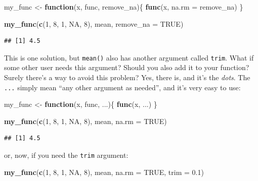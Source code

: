 \documentclass[]{gitbook}
\newenvironment{Shaded}{\begin{snugshade}}{\end{snugshade}}
\newcommand{\ControlFlowTok}[1]{\textcolor[rgb]{0.13,0.29,0.53}{\textbf{#1}}}
\newcommand{\DataTypeTok}[1]{\textcolor[rgb]{0.13,0.29,0.53}{#1}}
\newcommand{\DecValTok}[1]{\textcolor[rgb]{0.00,0.00,0.81}{#1}}
\newcommand{\FloatTok}[1]{\textcolor[rgb]{0.00,0.00,0.81}{#1}}
\newcommand{\KeywordTok}[1]{\textcolor[rgb]{0.13,0.29,0.53}{\textbf{#1}}}
\newcommand{\NormalTok}[1]{#1}
\newcommand{\OtherTok}[1]{\textcolor[rgb]{0.56,0.35,0.01}{#1}}
\newcommand{\StringTok}[1]{\textcolor[rgb]{0.31,0.60,0.02}{#1}}
\theoremstyle{definition}
\theoremstyle{definition}
\theoremstyle{definition}
\theoremstyle{remark}
\begin{document}
\begin{Shaded}
\begin{Highlighting}[]
\NormalTok{my_func <-}\StringTok{ }\ControlFlowTok{function}\NormalTok{(x, func, remove_na)\{}
  \KeywordTok{func}\NormalTok{(x, }\DataTypeTok{na.rm =}\NormalTok{ remove_na)}
\NormalTok{\}}

\KeywordTok{my_func}\NormalTok{(}\KeywordTok{c}\NormalTok{(}\DecValTok{1}\NormalTok{, }\DecValTok{8}\NormalTok{, }\DecValTok{1}\NormalTok{, }\OtherTok{NA}\NormalTok{, }\DecValTok{8}\NormalTok{), mean, }\DataTypeTok{remove_na =} \OtherTok{TRUE}\NormalTok{)}
\end{Highlighting}
\end{Shaded}

\begin{verbatim}
## [1] 4.5
\end{verbatim}

This is one solution, but \texttt{mean()} also has another argument
called \texttt{trim}. What if some other user needs this argument?
Should you also add it to your function? Surely there's a way to avoid
this problem? Yes, there is, and it's the \emph{dots}. The \texttt{...}
simply mean ``any other argument as needed'', and it's very easy to use:

\begin{Shaded}
\begin{Highlighting}[]
\NormalTok{my_func <-}\StringTok{ }\ControlFlowTok{function}\NormalTok{(x, func, ...)\{}
  \KeywordTok{func}\NormalTok{(x, ...)}
\NormalTok{\}}

\KeywordTok{my_func}\NormalTok{(}\KeywordTok{c}\NormalTok{(}\DecValTok{1}\NormalTok{, }\DecValTok{8}\NormalTok{, }\DecValTok{1}\NormalTok{, }\OtherTok{NA}\NormalTok{, }\DecValTok{8}\NormalTok{), mean, }\DataTypeTok{na.rm =} \OtherTok{TRUE}\NormalTok{)}
\end{Highlighting}
\end{Shaded}

\begin{verbatim}
## [1] 4.5
\end{verbatim}

or, now, if you need the \texttt{trim} argument:

\begin{Shaded}
\begin{Highlighting}[]
\KeywordTok{my_func}\NormalTok{(}\KeywordTok{c}\NormalTok{(}\DecValTok{1}\NormalTok{, }\DecValTok{8}\NormalTok{, }\DecValTok{1}\NormalTok{, }\OtherTok{NA}\NormalTok{, }\DecValTok{8}\NormalTok{), mean, }\DataTypeTok{na.rm =} \OtherTok{TRUE}\NormalTok{, }\DataTypeTok{trim =} \FloatTok{0.1}\NormalTok{)}
\end{Highlighting}
\end{Shaded}
\end{document}
